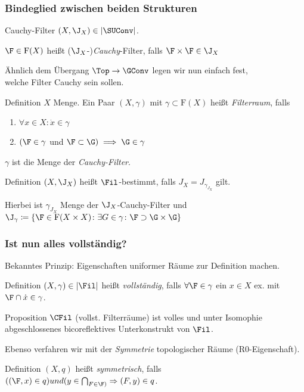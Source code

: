 \begin{frame}
  \frametitle{Bindeglied zwischen beiden Strukturen}
  \begin{block}{Cauchy-Filter}
    $(X,\J_X) \in |\SUConv|$.

    $\F \in \mathrm{F}(X)$ heißt ($\J_X$-)\emph{Cauchy}-Filter, falls $\F \times \F \in \J_X$
  \end{block}

  Ähnlich dem Übergang $\Top \to \GConv$ legen wir nun einfach fest,\\ welche Filter Cauchy sein sollen.

  \begin{block}{Definition}
    $X$ Menge. Ein Paar $(X, \gamma)$ mit $\gamma \subset \mathrm{F}(X)$ heißt \emph{Filterraum}, falls
    \begin{enumerate}[F1)]
      \item $\forall x \in X \colon \dot x \in \gamma$
      \item $(\F \in \gamma$ und $\F \subset \G) \implies \G \in \gamma$
    \end{enumerate}
    $\gamma$ ist die Menge der \emph{Cauchy-Filter}.
  \end{block}

  \begin{block}{Definition}
    $(X, \J_X)$ heißt $\Fil$-bestimmt, falls $J_X = J_{\gamma_{J_X}}$ gilt. 
    
    Hierbei ist
    $\gamma_{J_X}$ Menge der $\J_X$-Cauchy-Filter und $\J_\gamma \coloneqq \{ \F \in \mathrm{F}(X \times X) \colon \exists G \in \gamma \colon \F \supset \G \times \G\}$
  \end{block}
\end{frame}

\begin{frame}
  \frametitle{Ist nun alles vollständig?}

  Bekanntes Prinzip: Eigenschaften uniformer Räume zur Definition machen.

  \begin{block}{Definition}
    $(X, \gamma) \in |\Fil|$ heißt \emph{vollständig}, falls $\forall \F \in \gamma$ ein $x \in X$ ex. mit $\F \cap \dot x \in \gamma$.
  \end{block}

  \begin{block}{Proposition}
    $\CFil$ (vollst. Filterräume) ist volles und unter Isomophie abgeschlossenes bicoreflektives Unterkonstrukt von $\Fil$.
  \end{block}

  Ebenso verfahren wir mit der \emph{Symmetrie} topologischer Räume (R0-Eigenschaft).

  \begin{block}{Definition}
    $(X,q)$ heißt \emph{symmetrisch}, falls $((\F,x) \in q)  und (y \in \bigcap _{F \in \F)} \Rightarrow (F,y) \in q$.
  \end{block}
\end{frame}

